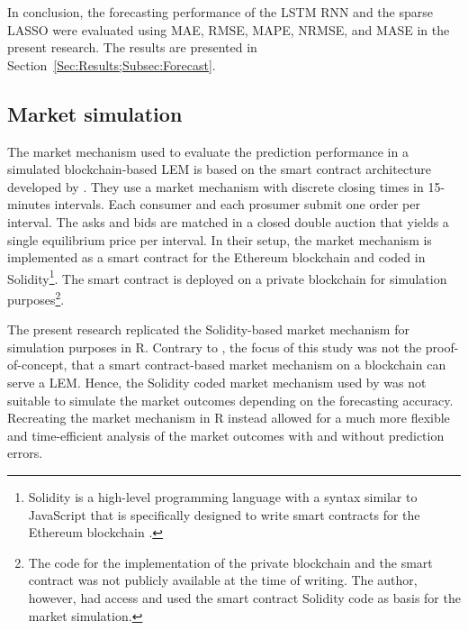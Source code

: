 In conclusion, the forecasting performance of the LSTM RNN and the sparse LASSO were evaluated using MAE, RMSE, MAPE, NRMSE, and MASE in the present research. The results are presented in Section~\ref{Sec:Results;Subsec:Forecast}.




\subsection{Market simulation} \label{Sec:Method;Subsec:Market}

The market mechanism used to evaluate the prediction performance in a simulated blockchain-based LEM is based on the smart contract architecture developed by \cites{Mengelkamp:2018a}. They use a market mechanism with discrete closing times in 15-minutes intervals. Each consumer and each prosumer submit one order per interval. The asks and bids are matched in a closed double auction that yields a single equilibrium price per interval. In their setup, the market mechanism is implemented as a smart contract for the Ethereum blockchain and coded in Solidity\footnote{Solidity is a high-level programming language with a syntax similar to JavaScript that is specifically designed to write smart contracts for the Ethereum blockchain \citetext{see \citet{Ethereum:2018doc} for details}.}. The smart contract is deployed on a private blockchain for simulation purposes\footnote{The code for the implementation of the private blockchain and the smart contract was not publicly available at the time of writing. The author, however, had access and used the smart contract Solidity code as basis for the market simulation.}.

The present research replicated the Solidity-based market mechanism for simulation purposes in R. Contrary to \citet{Mengelkamp:2018a}, the focus of this study was not the proof-of-concept, that a smart contract-based market mechanism on a blockchain can serve a LEM. Hence, the Solidity coded market mechanism used by \citet{Mengelkamp:2018a} was not suitable to simulate the market outcomes depending on the forecasting accuracy. Recreating the market mechanism in R instead allowed for a much more flexible and time-efficient analysis of the market outcomes with and without prediction errors.

